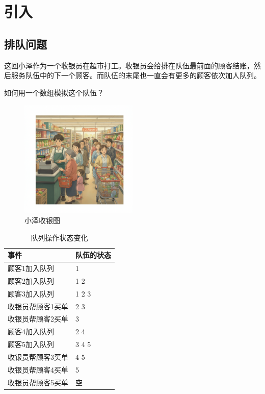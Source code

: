 \documentclass{report}
\begin{document}
\section{引入}

\subsection{排队问题}

这回小泽作为一个收银员在超市打工。收银员会给排在队伍最前面的顾客结账，然后服务队伍中的下一个顾客。而队伍的末尾也一直会有更多的顾客依次加人队列。

如何用一个数组模拟这个队伍？

\begin{figure}[H]
    \centering
    \includegraphics[width=0.5\textwidth]{./pic/Gemini_Generated_Image_2sj2u2sj2u2sj2u2.png}
    \caption{小泽收银图}
\end{figure}

\begin{table}[ht]
    \centering
    \begin{tabular}{@{}ll@{}}
        \toprule
        事件              & 队伍的状态 \\
        \midrule
        顾客1加入队列     & 1          \\
        顾客2加入队列     & 1 2        \\
        顾客3加入队列     & 1 2 3      \\
        收银员帮顾客1买单 & 2 3        \\
        收银员帮顾客2买单 & 3          \\
        顾客4加入队列     & 2 4        \\
        顾客5加入队列     & 3 4 5      \\
        收银员帮顾客3买单 & 4 5        \\
        收银员帮顾客4买单 & 5          \\
        收银员帮顾客5买单 & 空         \\
        \bottomrule
    \end{tabular}
    \caption{队列操作状态变化}
\end{table}
\end{document}
